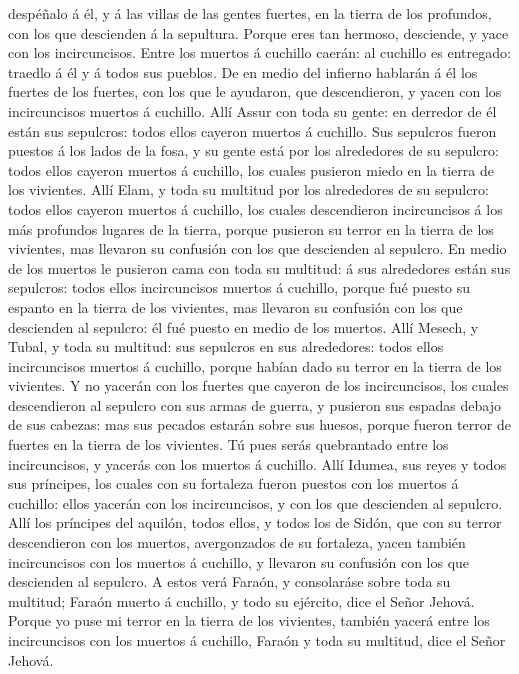 despéñalo á él, y á las villas de las gentes fuertes, en la tierra de
los profundos, con los que descienden á la sepultura. 
Porque eres tan hermoso, desciende, y yace con los incircuncisos.
 Entre los muertos á cuchillo caerán: al cuchillo es
entregado: traedlo á él y á todos sus pueblos.  De en
medio del infierno hablarán á él los fuertes de los fuertes, con los que
le ayudaron, que descendieron, y yacen con los incircuncisos muertos á
cuchillo.  Allí Assur con toda su gente: en derredor de
él están sus sepulcros: todos ellos cayeron muertos á cuchillo.
 Sus sepulcros fueron puestos á los lados de la fosa, y
su gente está por los alrededores de su sepulcro: todos ellos cayeron
muertos á cuchillo, los cuales pusieron miedo en la tierra de los
vivientes.  Allí Elam, y toda su multitud por los
alrededores de su sepulcro: todos ellos cayeron muertos á cuchillo, los
cuales descendieron incircuncisos á los más profundos lugares de la
tierra, porque pusieron su terror en la tierra de los vivientes, mas
llevaron su confusión con los que descienden al sepulcro.
 En medio de los muertos le pusieron cama con toda su
multitud: á sus alrededores están sus sepulcros: todos ellos
incircuncisos muertos á cuchillo, porque fué puesto su espanto en la
tierra de los vivientes, mas llevaron su confusión con los que
descienden al sepulcro: él fué puesto en medio de los muertos.
 Allí Mesech, y Tubal, y toda su multitud: sus sepulcros
en sus alrededores: todos ellos incircuncisos muertos á cuchillo, porque
habían dado su terror en la tierra de los vivientes.  Y
no yacerán con los fuertes que cayeron de los incircuncisos, los cuales
descendieron al sepulcro con sus armas de guerra, y pusieron sus espadas
debajo de sus cabezas: mas sus pecados estarán sobre sus huesos, porque
fueron terror de fuertes en la tierra de los vivientes. 
Tú pues serás quebrantado entre los incircuncisos, y yacerás con los
muertos á cuchillo.  Allí Idumea, sus reyes y todos sus
príncipes, los cuales con su fortaleza fueron puestos con los muertos á
cuchillo: ellos yacerán con los incircuncisos, y con los que descienden
al sepulcro.  Allí los príncipes del aquilón, todos
ellos, y todos los de Sidón, que con su terror descendieron con los
muertos, avergonzados de su fortaleza, yacen también incircuncisos con
los muertos á cuchillo, y llevaron su confusión con los que descienden
al sepulcro.  A estos verá Faraón, y consolaráse sobre
toda su multitud; Faraón muerto á cuchillo, y todo su ejército, dice el
Señor Jehová.  Porque yo puse mi terror en la tierra de
los vivientes, también yacerá entre los incircuncisos con los muertos á
cuchillo, Faraón y toda su multitud, dice el Señor Jehová.

